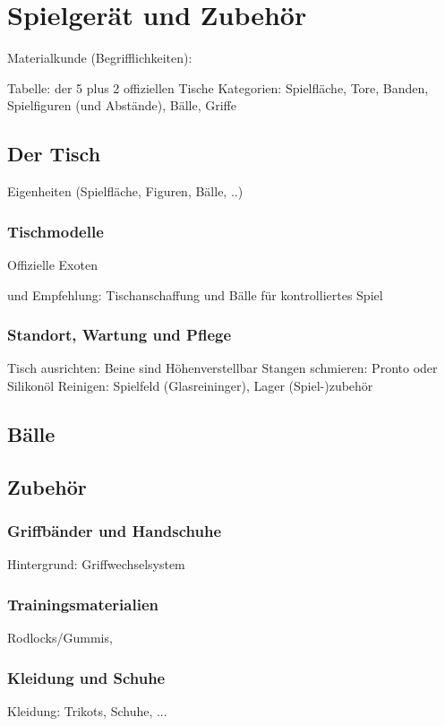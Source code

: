 \chapter{Spielgerät und Zubehör}
\label{tisch}

Materialkunde (Begrifflichkeiten):


Tabelle: der 5 plus 2 offiziellen Tische
Kategorien: 
Spielfläche, Tore, Banden, 
Spielfiguren (und Abstände), Bälle, 
Griffe

\section{Der Tisch}
\label{tisch:tisch}
Eigenheiten (Spielfläche, Figuren, Bälle, ..)

\subsection{Tischmodelle}
\label{tisch:tisch:modelle}
\label{tisch}

Offizielle
Exoten

und Empfehlung: Tischanschaffung und Bälle für kontrolliertes Spiel

\subsection{Standort, Wartung und Pflege}
\label{tisch:tisch:standort}

Tisch ausrichten: Beine sind Höhenverstellbar
Stangen schmieren: Pronto oder Silikonöl
Reinigen: Spielfeld (Glasreininger), Lager
(Spiel-)zubehör 

\section{Bälle}
\label{tisch:baelle}



\section{Zubehör}
\label{tisch:zubehoer}


\subsection{Griffbänder und Handschuhe}
\label{tisch:zubehoer:griffe}



Hintergrund: Griffwechselsystem

\subsection{Trainingsmaterialien}
\label{tisch:zubehoer:training}
Rodlocks/Gummis,  

\subsection{Kleidung und Schuhe}
\label{tisch:zubehoer:kleidung}
Kleidung: Trikots, Schuhe, ...
